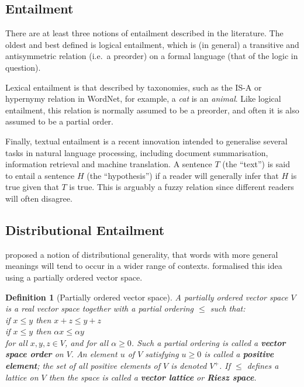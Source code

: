 \documentclass{article}
\newtheorem{definition}{Definition}
\begin{document}
\subsection{Entailment}

There are at least three notions of entailment described in the
literature. The oldest and best defined is logical entailment, which
is (in general) a transitive and antisymmetric relation (i.e.~a
preorder) on a formal language (that of the logic in question).

Lexical entailment is that described by taxonomies, such as the IS-A
or hypernymy relation in WordNet, for example, a \emph{cat} is an
\emph{animal}. Like logical entailment, this relation is normally
assumed to be a preorder, and often it is also assumed to be a partial
order.

Finally, textual entailment is a recent innovation intended to
generalise several tasks in natural language processing, including
document summarisation, information retrieval and machine
translation. A sentence $T$ (the ``text'') is said to entail a
sentence $H$ (the ``hypothesis'') if a reader will generally infer
that $H$ is true given that $T$ is true. This is arguably a fuzzy
relation since different readers will often disagree.

\subsection{Distributional Entailment}

 proposed a notion of distributional generality, that
words with more general meanings will tend to occur in a wider range
of contexts.  formalised this idea using a partially
ordered vector space.

\begin{definition}[Partially ordered vector space]
  A partially ordered vector space $V$ is a real vector space together
  with a partial ordering $\le$ such that:
  \vspace{0.1cm}\\
  \indent if $x \le y$ then $x + z \le y + z$\\
  \indent if $x \le y$ then $\alpha x \le \alpha y$
  \vspace{0.1cm}\\
  for all $x,y,z \in V$, and for all $\alpha \ge 0$. Such a partial
  ordering is called a \textbf{vector space order} on $V$. An element
  $u$ of $V$ satisfying $u \ge 0$ is called a \textbf{positive
    element}; the set of all positive elements of $V$ is denoted
  $V^+$. If $\le$ defines a lattice on $V$ then the space is called a
  \textbf{vector lattice} or \textbf{Riesz space}.
\end{definition}
\end{document}
